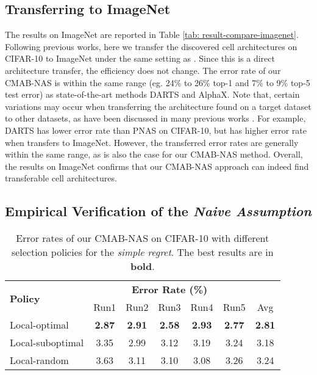 \documentclass[conference]{IEEEtran}
\begin{document}
\subsection{Transferring to ImageNet}
\par
The results on ImageNet \cite{imagenet_cvpr09} are reported in Table \ref{tab: result-compare-imagenet}. Following previous works, here we transfer the discovered cell architectures on CIFAR-10 to ImageNet under the same setting as \cite{Chen2019pdarts,liu2018darts,wang2019alphax}. Since this is a direct architecture transfer, the efficiency does not change. 
The error rate of our CMAB-NAS is within the same range (eg. 24\% to 26\% top-1 and 7\% to 9\% top-5 test error) as state-of-the-art methods DARTS and AlphaX. Note that, certain variations may occur when transferring the architecture found on a target dataset to other datasets, as have been discussed in many previous works \cite{Chen2019pdarts, chu2019fair, liu2018progressive, liu2018darts, real2019regularized, wang2019alphax}.
For example, DARTS has lower error rate than PNAS on CIFAR-10, but has higher error rate when transfers to ImageNet. However, the transferred error rates are generally within the same range, as is also the case for our CMAB-NAS method. Overall, the results on ImageNet confirms that our CMAB-NAS approach can indeed find transferable cell architectures.

\subsection{Empirical Verification of the \emph{Naive Assumption}}
\label{sec:selection_policy}

\begin{table}[h]
\centering
\caption{Error rates of our CMAB-NAS on CIFAR-10 with different selection policies for the \emph{simple regret}. The best results are in \textbf{bold}.}
\label{tab: policy-compare-second}
\begin{adjustbox}{max width=\linewidth}
\begin{tabular}{lcccccc}
\hline
\multirow{2}{*}{\textbf{Policy}} & \multicolumn{5}{c}{\textbf{Error Rate (\%)}}        \\ 
                                & Run1  & Run2  & Run3  & Run4  & Run5  & Avg          \\ \hline
Local-optimal                   & \textbf{2.87}  & \textbf{2.91}  & \textbf{2.58}  & \textbf{2.93}  & \textbf{2.77}  & \textbf{2.81}         \\
Local-suboptimal                & 3.35  & 2.99  & 3.12  & 3.19  & 3.24  & 3.18         \\
Local-random                    & 3.63  & 3.11  & 3.10  & 3.08  & 3.26  & 3.24         \\ \hline
\end{tabular}
\end{adjustbox}
\end{table}
\end{document}
